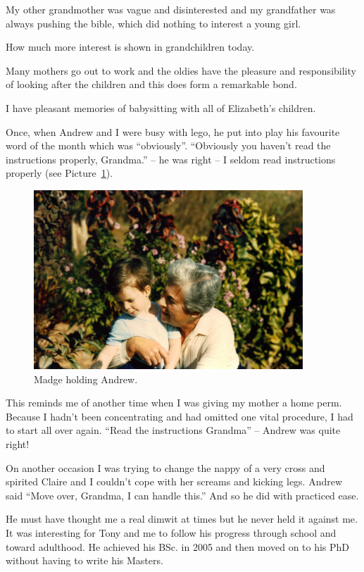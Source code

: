 My other grandmother was vague and disinterested and my grandfather
was always pushing the bible, which did nothing to interest a young
girl.

How much more interest is shown in grandchildren today.

Many mothers go out to work and the oldies have the pleasure and
responsibility of looking after the children and this does form a
remarkable bond.

I have pleasant memories of babysitting with all of Elizabeth's
children.

Once, when Andrew and I were busy with lego, he put into play his
favourite word of the month which was ``obviously''. ``Obviously you
haven't read the instructions properly, Grandma.'' -- he was right --
I seldom read instructions properly (see Picture~\ref{madge-and-andrew}).

\begin{figure}
  \centering
  \includegraphics[width=0.9\textwidth]{photos/madge-and-andrew.jpg}
  \caption{Madge holding Andrew.}
  \label{madge-and-andrew}
\end{figure}

This reminds me of another time when I was giving my mother a home
perm. Because I hadn't been concentrating and had omitted one vital
procedure, I had to start all over again. ``Read the instructions
Grandma'' -- Andrew was quite right!

On another occasion I was trying to change the nappy of a very cross
and spirited Claire and I couldn't cope with her screams and kicking
legs. Andrew said ``Move over, Grandma, I can handle this.'' And so he
did with practiced ease.

He must have thought me a real dimwit at times but he never held it
against me. It was interesting for Tony and me to follow his progress
through school and toward adulthood. He achieved his BSc. in 2005 and
then moved on to his PhD without having to write his Masters.

